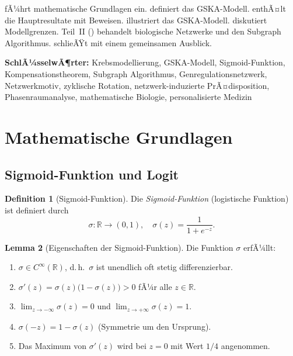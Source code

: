 ﻿\documentclass[12pt, a4paper]{article}
\theoremstyle{definition}
\newtheorem{definition}{Definition}[section]
\newtheorem{lemma}[definition]{Lemma}
\theoremstyle{remark}
\newcommand{\R}{\mathbb{R}}
\begin{document}
 fÃ¼hrt mathematische Grundlagen ein.
 definiert das GSKA-Modell.
 enthÃ¤lt die Hauptresultate mit Beweisen.
 illustriert das GSKA-Modell.
 diskutiert Modellgrenzen.
Teil~II () behandelt biologische Netzwerke und den Subgraph Algorithmus.
 schlieÃŸt mit einem gemeinsamen Ausblick.

\textbf{SchlÃ¼sselwÃ¶rter:}
  Krebsmodellierung, GSKA-Modell, Sigmoid-Funktion, Kompensationstheorem,
  Subgraph Algorithmus, Genregulationsnetzwerk, Netzwerkmotiv, zyklische
  Rotation, netzwerk-induzierte PrÃ¤disposition, Phasenraumanalyse,
  mathematische Biologie, personalisierte Medizin

\section{Mathematische Grundlagen}
\label{sec:grundlagen}


\subsection{Sigmoid-Funktion und Logit}

\begin{definition}[Sigmoid-Funktion]
\label{def:sigmoid}
Die \emph{Sigmoid-Funktion} (logistische Funktion) ist definiert durch
\[
  \sigma : \R \to (0,1), \quad \sigma(z) = \frac{1}{1 + e^{-z}}.
\]
\end{definition}

\begin{lemma}[Eigenschaften der Sigmoid-Funktion]
\label{lem:sigmoid_props}
Die Funktion $\sigma$ erfÃ¼llt:
\begin{enumerate}[label=(\alph*)]
  \item $\sigma \in C^\infty(\R)$, d.\,h.\ $\sigma$ ist unendlich oft stetig differenzierbar.
  \item $\sigma'(z) = \sigma(z)\bigl(1-\sigma(z)\bigr) > 0$ fÃ¼r alle $z \in \R$.
  \item $\lim_{z \to -\infty}\sigma(z) = 0$ und $\lim_{z \to +\infty}\sigma(z) = 1$.
  \item $\sigma(-z) = 1 - \sigma(z)$ (Symmetrie um den Ursprung).
  \item Das Maximum von $\sigma'(z)$ wird bei $z=0$ mit Wert $1/4$ angenommen.
\end{enumerate}
\end{lemma}
\end{document}
